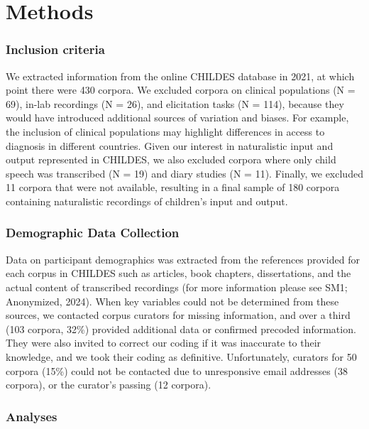 \documentclass[
  man,floatsintext]{apa6}
\begin{document}
\section{Methods}\label{methods}

\subsubsection{Inclusion criteria}\label{inclusion-criteria}

We extracted information from the online CHILDES database in 2021, at which point there were 430 corpora. We excluded corpora on clinical populations (N = 69), in-lab recordings (N = 26), and elicitation tasks (N = 114), because they would have introduced additional sources of variation and biases. For example, the inclusion of clinical populations may highlight differences in access to diagnosis in different countries. Given our interest in naturalistic input and output represented in CHILDES, we also excluded corpora where only child speech was transcribed (N = 19) and diary studies (N = 11). Finally, we excluded 11 corpora that were not available, resulting in a final sample of 180 corpora containing naturalistic recordings of children's input and output.

\subsubsection{Demographic Data Collection}\label{demographic-data-collection}

Data on participant demographics was extracted from the references provided for each corpus in CHILDES such as articles, book chapters, dissertations, and the actual content of transcribed recordings (for more information please see SM1; Anonymized, 2024). When key variables could not be determined from these sources, we contacted corpus curators for missing information, and over a third (103 corpora, 32\%) provided additional data or confirmed precoded information. They were also invited to correct our coding if it was inaccurate to their knowledge, and we took their coding as definitive. Unfortunately, curators for 50 corpora (15\%) could not be contacted due to unresponsive email addresses (38 corpora), or the curator's passing (12 corpora).

\subsubsection{Analyses}\label{analyses}
\end{document}
